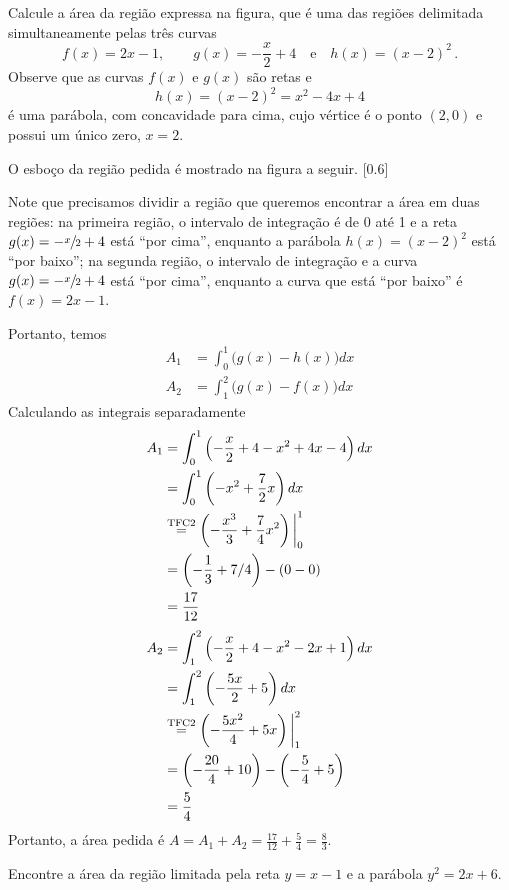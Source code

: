 \begin{example}
  Calcule a área da região  expressa na figura, que é uma das regiões
  delimitada simultaneamente pelas três curvas
  \[
    f(x) = 2x-1, \qquad
    g(x) =-\frac{x}{2}+4\quad\text{e}\quad
    h(x)=(x-2)^2 \,.
  \]
  \solution
    Observe que as curvas $f(x)$ e $g(x)$ são retas e
    \[h(x)=(x-2)^2=x^2-4x+4\]
    é uma parábola, com concavidade para cima, cujo vértice é o ponto $(2, 0)$
    e possui um único zero, $x=2$.

  O esboço da região pedida é mostrado na figura a seguir.
  [0.6]

  Note que precisamos dividir a região que queremos encontrar a área em duas
  regiões: na primeira região, o intervalo de integração é de 0 até 1
  e a reta
  $g(x) = -\sfrac{x}{2}+4$ está ``por cima'', enquanto a parábola
  $h(x)=(x-2)^2$ está ``por baixo'';
  na segunda região, o intervalo de integração e a curva
  $g(x)=-\sfrac{x}{2}+4$ está ``por cima'', enquanto a curva que está
  ``por baixo'' é
  $f(x)=2x-1$.

  Portanto, temos
  \begin{align*}
    A_1 & = \int_0^1 \big( g(x)-h(x) \big) dx \\
    A_2 & = \int_1^2 \big( g(x)-f(x) \big) dx
  \end{align*}
  Calculando as integrais separadamente
  \begin{align*}
      A_1
      & = \int_0^1 \left( -\frac{x}{2}+4-x^2+4x-4 \right) dx \\
      & = \int_0^1 \left( -x^2 + \frac{7}{2}x\right) dx \\
      & \stackrel{\text{\scriptsize TFC2}}{=} \left( -\frac{x^3}{3}+\frac{7}{4}x^2 \right) \bigg\rvert_{0}^{1} \\
      & = \left(-\frac{1}{3}+7/4 \right)-(0-0) \\
      & =\frac{17}{12}
  \end{align*}
  \begin{align*}
        A_2
      & = \int_1^2 \left( -\frac{x}{2}+4-x^2-2x+1 \right) dx \\
      & = \int_1^2 \left( -\frac{5x}{2}+5 \right) dx \\
      & \stackrel{\text{\scriptsize TFC2}}{=} \left( -\frac{5x^2}{4}+5x \right) \bigg\rvert_{1}^{2} \\
      & = \left(-\frac{20}{4}+10 \right)-\left(-\frac{5}{4}+5 \right) \\
      & =\frac{5}{4}
  \end{align*}
  Portanto, a área pedida é
  \(
    A
    = A_1 + A_2
    = \frac{17}{12} + \frac{5}{4}
    = \frac{8}{3}
  \).
\end{example}

\begin{example}
  Encontre a área da região limitada pela reta $y=x-1$ e a parábola $y^2=2x+6$.
\end{example}

